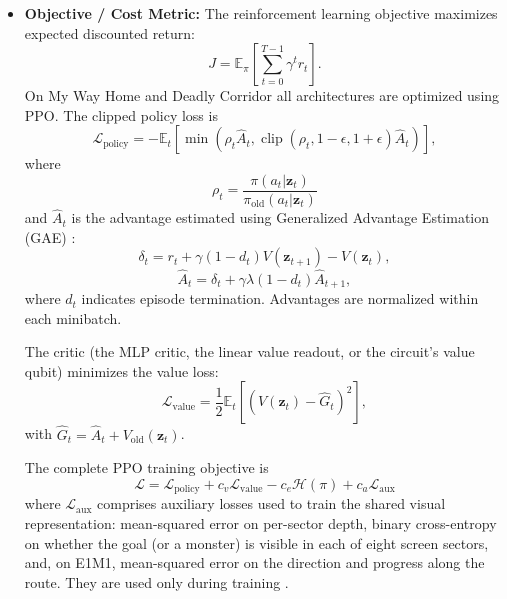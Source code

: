 \documentclass[10pt, a4paper]{article}
\begin{document}
\begin{itemize}
    \item \textbf{Objective / Cost Metric:}
    The reinforcement learning objective maximizes
    expected discounted return:
    \begin{equation}
        J=\mathbb{E}_{\pi}
        \left[\sum_{t=0}^{T-1}\gamma^t r_t\right].
    \end{equation}
    On My Way Home and Deadly Corridor all architectures are optimized using PPO.
    The clipped policy loss is
    \begin{equation}
        \mathcal{L}_{\mathrm{policy}} =
        -\mathbb{E}_t\left[
        \min\left(
        \rho_t\hat{A}_t,
        \operatorname{clip}(\rho_t,1-\epsilon,1+\epsilon)
        \hat{A}_t\right)\right],
    \end{equation}
    where
    \begin{equation}
        \rho_t =
        \frac{\pi(a_t|\mathbf{z}_t)}
        {\pi_{\mathrm{old}}(a_t|\mathbf{z}_t)}
    \end{equation}
    and $\hat{A}_t$ is the advantage estimated using
    Generalized Advantage Estimation (GAE) \cite{schulman_gae_2016}:
    \begin{equation}
        \delta_t=r_t+\gamma(1-d_t)V(\mathbf{z}_{t+1})
        -V(\mathbf{z}_t),
    \end{equation}
    \begin{equation}
        \hat{A}_t=\delta_t+
        \gamma\lambda(1-d_t)\hat{A}_{t+1},
    \end{equation}
    where $d_t$ indicates episode termination.
    Advantages are normalized within each minibatch.

    The critic (the MLP critic, the linear value readout, or the circuit's value qubit) minimizes the value loss:
    \begin{equation}
        \mathcal{L}_{\mathrm{value}}=
        \frac{1}{2}\mathbb{E}_t
        \left[(V(\mathbf{z}_t)-\hat{G}_t)^2\right],
    \end{equation}
    with $\hat{G}_t=\hat{A}_t+V_{\mathrm{old}}
    (\mathbf{z}_t)$.

    The complete PPO training objective \cite{schulman_ppo_2017} is
    \begin{equation}
        \boxed{
        \mathcal{L}=
        \mathcal{L}_{\mathrm{policy}}
        +c_v\mathcal{L}_{\mathrm{value}}
        -c_e\mathcal{H}(\pi)
        +c_a\mathcal{L}_{\mathrm{aux}}
        }
    \end{equation}
    where $\mathcal{L}_{\mathrm{aux}}$ comprises
    auxiliary losses used to train the shared visual representation:
    mean-squared error on per-sector depth, binary cross-entropy on whether the goal (or a monster)
    is visible in each of eight screen sectors, and, on E1M1, mean-squared error on the direction
    and progress along the route. They are used only during training \cite{mirowski_navigate_2017,lample_fps_2017}.


\end{itemize}
\end{document}
